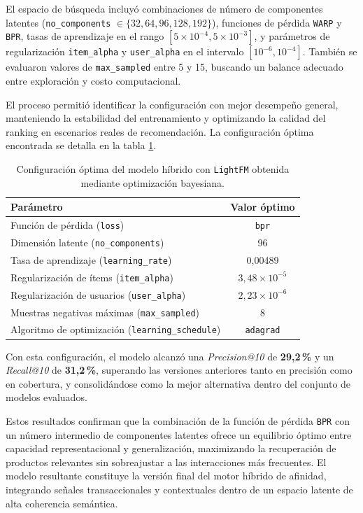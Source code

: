 El espacio de búsqueda incluyó combinaciones de número de componentes latentes (\texttt{no\_components} $\in \{32, 64, 96, 128, 192\}$), funciones de pérdida \texttt{WARP} y \texttt{BPR}, tasas de aprendizaje en el rango $[5 \times 10^{-4}, 5 \times 10^{-3}]$, y parámetros de regularización \texttt{item\_alpha} y \texttt{user\_alpha} en el intervalo $[10^{-6}, 10^{-4}]$. También se evaluaron valores de \texttt{max\_sampled} entre 5 y 15, buscando un balance adecuado entre exploración y costo computacional.

El proceso permitió identificar la configuración con mejor desempeño general, manteniendo la estabilidad del entrenamiento y optimizando la calidad del ranking en escenarios reales de recomendación. La configuración óptima encontrada se detalla en la tabla \ref{tab:lightfm_best_params}.

\begin{table}[h]
	\centering
	\caption[Hiperparámetros óptimos del modelo LightFM]{Configuración óptima del modelo híbrido con \texttt{LightFM} obtenida mediante optimización bayesiana.}
	\begin{tabular}{l c}
		\toprule
		\textbf{Parámetro} & \textbf{Valor óptimo} \\
		\midrule
		Función de pérdida (\texttt{loss}) & \texttt{bpr} \\
		Dimensión latente (\texttt{no\_components}) & 96 \\
		Tasa de aprendizaje (\texttt{learning\_rate}) & 0{,}00489 \\
		Regularización de ítems (\texttt{item\_alpha}) & $3{,}48 \times 10^{-5}$ \\
		Regularización de usuarios (\texttt{user\_alpha}) & $2{,}23 \times 10^{-6}$ \\
		Muestras negativas máximas (\texttt{max\_sampled}) & 8 \\
		Algoritmo de optimización (\texttt{learning\_schedule}) & \texttt{adagrad} \\
		\bottomrule
	\end{tabular}
	\label{tab:lightfm_best_params}
\end{table}

Con esta configuración, el modelo alcanzó una \textit{Precision@10} de \textbf{29{,}2\,\%} y un \textit{Recall@10} de \textbf{31{,}2\,\%}, superando las versiones anteriores tanto en precisión como en cobertura, y consolidándose como la mejor alternativa dentro del conjunto de modelos evaluados. 

Estos resultados confirman que la combinación de la función de pérdida \texttt{BPR} con un número intermedio de componentes latentes ofrece un equilibrio óptimo entre capacidad representacional y generalización, maximizando la recuperación de productos relevantes sin sobreajustar a las interacciones más frecuentes. El modelo resultante constituye la versión final del motor híbrido de afinidad, integrando señales transaccionales y contextuales dentro de un espacio latente de alta coherencia semántica.


